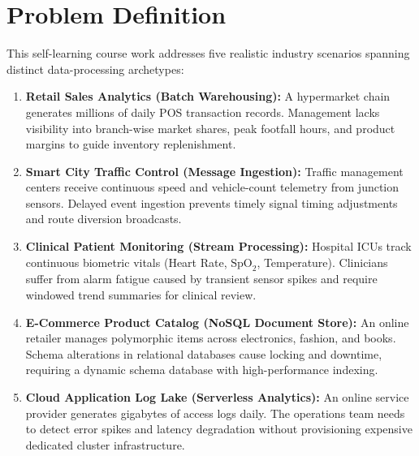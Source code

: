 \documentclass[12pt,a4paper]{report}
\begin{document}
\section{Problem Definition}
This self-learning course work addresses five realistic industry scenarios spanning distinct data-processing archetypes:
\begin{enumerate}
    \item \textbf{Retail Sales Analytics (Batch Warehousing):} A hypermarket chain generates millions of daily POS transaction records. Management lacks visibility into branch-wise market shares, peak footfall hours, and product margins to guide inventory replenishment.
    \item \textbf{Smart City Traffic Control (Message Ingestion):} Traffic management centers receive continuous speed and vehicle-count telemetry from junction sensors. Delayed event ingestion prevents timely signal timing adjustments and route diversion broadcasts.
    \item \textbf{Clinical Patient Monitoring (Stream Processing):} Hospital ICUs track continuous biometric vitals (Heart Rate, $\text{SpO}_2$, Temperature). Clinicians suffer from alarm fatigue caused by transient sensor spikes and require windowed trend summaries for clinical review.
    \item \textbf{E-Commerce Product Catalog (NoSQL Document Store):} An online retailer manages polymorphic items across electronics, fashion, and books. Schema alterations in relational databases cause locking and downtime, requiring a dynamic schema database with high-performance indexing.
    \item \textbf{Cloud Application Log Lake (Serverless Analytics):} An online service provider generates gigabytes of access logs daily. The operations team needs to detect error spikes and latency degradation without provisioning expensive dedicated cluster infrastructure.
\end{enumerate}
\end{document}
